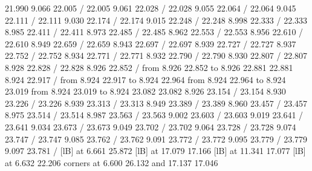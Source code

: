 {{ 21.990  9.066 22.005 /
 22.005  9.061 22.028 /
 22.028  9.055 22.064 /
 22.064  9.045 22.111 /
 22.111  9.030 22.174 /
 22.174  9.015 22.248 /
 22.248  8.998 22.333 /
 22.333  8.985 22.411 /
 22.411  8.973 22.485 /
 22.485  8.962 22.553 /
 22.553  8.956 22.610 /
 22.610  8.949 22.659 /
 22.659  8.943 22.697 /
 22.697  8.939 22.727 /
 22.727  8.937 22.752 /
 22.752  8.934 22.771 /
 22.771  8.932 22.790 /
 22.790  8.930 22.807 /
 22.807  8.928 22.828 /
 22.828  8.926 22.852 /
\putrule from  8.926 22.852 to  8.926 22.881
 22.881  8.924 22.917 /
\putrule from  8.924 22.917 to  8.924 22.964
\putrule from  8.924 22.964 to  8.924 23.019
\putrule from  8.924 23.019 to  8.924 23.082
 23.082  8.926 23.154 /
 23.154  8.930 23.226 /
 23.226  8.939 23.313 /
 23.313  8.949 23.389 /
 23.389  8.960 23.457 /
 23.457  8.975 23.514 /
 23.514  8.987 23.563 /
 23.563  9.002 23.603 /
 23.603  9.019 23.641 /
 23.641  9.034 23.673 /
 23.673  9.049 23.702 /
 23.702  9.064 23.728 /
 23.728  9.074 23.747 /
 23.747  9.085 23.762 /
 23.762  9.091 23.772 /
 23.772  9.095 23.779 /
 23.779  9.097 23.781 /
}%
%
%
 [lB] at  6.661 25.872
%
%
 [lB] at 17.079 17.166
%
%
 [lB] at 11.341 17.077
%
%
 [lB] at  6.632 22.206
\linethickness=0pt
\putrectangle corners at  6.600 26.132 and 17.137 17.046
\endpicture}
